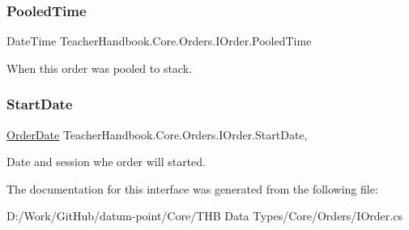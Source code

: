 \subsubsection{\texorpdfstring{Pooled\+Time}{PooledTime}}
{\footnotesize\ttfamily Date\+Time Teacher\+Handbook.\+Core.\+Orders.\+I\+Order.\+Pooled\+Time\hspace{0.3cm}{\ttfamily [get]}}



When this order was pooled to stack. 

\mbox{\label{interface_teacher_handbook_1_1_core_1_1_orders_1_1_i_order_a095dc6b1b492dee172826971fa7ec0b2}} 
\subsubsection{\texorpdfstring{Start\+Date}{StartDate}}
{\footnotesize\ttfamily \mbox{\hyperlink{struct_teacher_handbook_1_1_core_1_1_orders_1_1_order_date}{Order\+Date}} Teacher\+Handbook.\+Core.\+Orders.\+I\+Order.\+Start\+Date\hspace{0.3cm}{\ttfamily [get]}, {\ttfamily [set]}}



Date and session whe order will started. 



The documentation for this interface was generated from the following file\+:\begin{DoxyCompactItemize}
\item 
D\+:/\+Work/\+Git\+Hub/datum-\/point/\+Core/\+T\+H\+B Data Types/\+Core/\+Orders/I\+Order.\+cs\end{DoxyCompactItemize}
